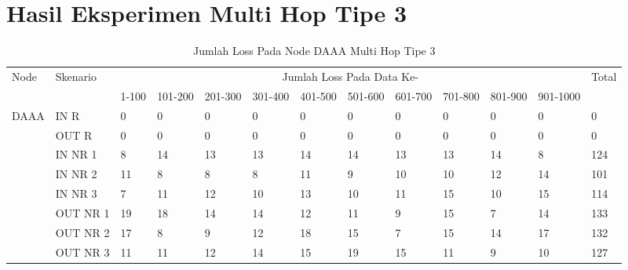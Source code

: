 \chapter{Hasil Eksperimen Multi Hop Tipe 3}
\label{lamp:E}

\begin{table}[H]
  \centering
  \caption{Jumlah Loss Pada Node DAAA Multi Hop Tipe 3}
    \begin{tabular}{|p{1cm}|p{1.9cm}|p{0.6cm}|p{0.6cm}|p{0.6cm}|p{0.6cm}|p{0.6cm}|p{0.6cm}|p{0.6cm}|p{0.6cm}|p{0.6cm}|p{0.6cm}|p{1cm}|}
    \hline
        \multirow{2}{*}{Node}&\multirow{2}{*}{Skenario}&\multicolumn{10}{|c|}{Jumlah Loss Pada Data Ke-}&\multirow{2}{*}{Total} \\\cline{3-12}
          & & 1-100 & 101-200 & 201-300 & 301-400 & 401-500 & 501-600 & 601-700 & 701-800 & 801-900 & 901-1000 & \\
        \hline
    \multirow{8}{*}{DAAA}  
    & IN R  & 0     & 0     & 0     & 0     & 0     & 0     & 0     & 0     & 0     & 0     & 0 \\
          & OUT R & 0     & 0     & 0     & 0     & 0     & 0     & 0     & 0     & 0     & 0     & 0 \\
          & IN NR 1 & 8     & 14    & 13    & 13    & 14    & 14    & 13    & 13    & 14    & 8     & 124 \\
          & IN NR 2 & 11    & 8     & 8     & 8     & 11    & 9     & 10    & 10    & 12    & 14    & 101 \\
          & IN NR 3 & 7     & 11    & 12    & 10    & 13    & 10    & 11    & 15    & 10    & 15    & 114 \\
          & OUT NR 1 & 19    & 18    & 14    & 14    & 12    & 11    & 9     & 15    & 7     & 14    & 133 \\
          & OUT NR 2 & 17    & 8     & 9     & 12    & 18    & 15    & 7     & 15    & 14    & 17    & 132 \\
          & OUT NR 3 & 11    & 11    & 12    & 14    & 15    & 19    & 15    & 11    & 9     & 10    & 127 \\
    \hline
    \end{tabular}%
  \label{tab:addlabel}%
\end{table}%

